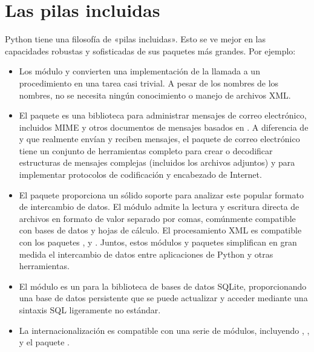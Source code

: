 \documentclass[a4,10pt,spanish]{sphinxmanual}
\begin{document}
\section{Las pilas incluidas}
\label{\detokenize{tutorial/stdlib:batteries-included}}\label{\detokenize{tutorial/stdlib:tut-batteries-included}}
\sphinxAtStartPar
Python tiene una filosofía de «pilas incluidas».  Esto se ve mejor en las capacidades robustas y sofisticadas de sus paquetes más grandes.  Por ejemplo:
\begin{itemize}
\item {} 
\sphinxAtStartPar
Los módulo  y  convierten una implementación de la llamada a un procedimiento en una tarea casi trivial. A pesar de los nombres de los nombres, no se necesita ningún conocimiento o manejo de archivos XML.

\item {} 
\sphinxAtStartPar
El paquete  es una biblioteca para administrar mensajes de correo electrónico, incluidos MIME y otros documentos de mensajes basados en . A diferencia de  y  que realmente envían y reciben mensajes, el paquete de correo electrónico tiene un conjunto de herramientas completo para crear o decodificar estructuras de mensajes complejas (incluidos los archivos adjuntos) y para implementar protocolos de codificación y encabezado de Internet.

\item {} 
\sphinxAtStartPar
El paquete  proporciona un sólido soporte para analizar este popular formato de intercambio de datos.  El módulo  admite la lectura y escritura directa de archivos en formato de valor separado por comas, comúnmente compatible con bases de datos y hojas de cálculo.  El procesamiento XML es compatible con los paquetes ,  y . Juntos, estos módulos y paquetes simplifican en gran medida el intercambio de datos entre aplicaciones de Python y otras herramientas.

\item {} 
\sphinxAtStartPar
El módulo  es un  para la biblioteca de bases de datos SQLite, proporcionando una base de datos persistente que se puede actualizar y acceder mediante una sintaxis SQL ligeramente no estándar.

\item {} 
\sphinxAtStartPar
La internacionalización es compatible con una serie de módulos, incluyendo , , y el paquete .

\end{itemize}
\end{document}
